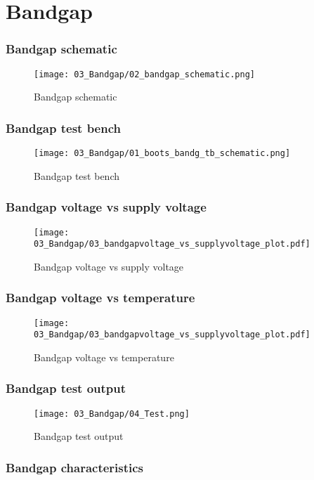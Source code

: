 \documentclass[xcolor=dvipsnames,envcountsect]{beamer}
\begin{document}
\section{Bandgap}
\begin{frame}
	\frametitle{Bandgap schematic}
	\begin{figure}[ht]
		\centering
		\texttt{[image: 03\_Bandgap/02\_bandgap\_schematic.png]}
		\caption{Bandgap schematic}
	\end{figure}
\end{frame}

\begin{frame}
	\frametitle{Bandgap test bench}
	\begin{figure}[ht]
		\centering
		\texttt{[image: 03\_Bandgap/01\_boots\_bandg\_tb\_schematic.png]}
		\caption{Bandgap test bench}
	\end{figure}
\end{frame}

\begin{frame}
	\frametitle{Bandgap voltage vs supply voltage}
	\begin{figure}[ht]
		\centering
		\texttt{[image: 03\_Bandgap/03\_bandgapvoltage\_vs\_supplyvoltage\_plot.pdf]}
		\caption{Bandgap voltage vs supply voltage}
	\end{figure}
\end{frame}
\begin{frame}
	\frametitle{Bandgap voltage vs temperature}
	\begin{figure}[ht]
		\centering
		\texttt{[image: 03\_Bandgap/03\_bandgapvoltage\_vs\_supplyvoltage\_plot.pdf]}
		\caption{Bandgap voltage vs temperature}
	\end{figure}
\end{frame}
\begin{frame}
	\frametitle{Bandgap test output}
	\begin{figure}[ht]
		\centering
		\texttt{[image: 03\_Bandgap/04\_Test.png]}
		\caption{Bandgap test output}
	\end{figure}
\end{frame}

\begin{frame}
	\frametitle{Bandgap characteristics}
	\begin{figure}[ht]
		\centering
	\end{figure}
\end{frame}
\end{document}
